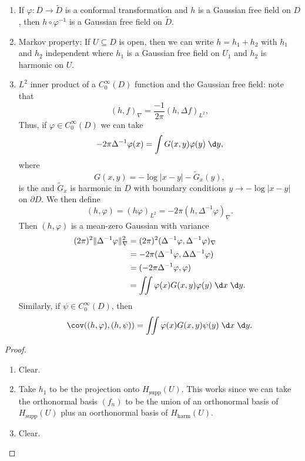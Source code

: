 \documentclass[a4paper]{article}
\begin{document}
\begin{prop}\leavevmode
  \begin{enumerate}
    \item If $\varphi: D \to \tilde{D}$ is a conformal transformation and $h$ is a Gaussian free field on $D$, then $h \circ \varphi^{-1}$ is a Gaussian free field on $\tilde{D}$.
    \item Markov property: If $U \subseteq D$ is open, then we can write $h = h_1 + h_2$ with $h_1$ and $h_2$ independent where $h_1$ is a Gaussian free field on $U_1$ and $h_2$ is harmonic on $U$.
    \item $L^2$ inner product of a $C_0^\infty(D)$ function and the Gaussian free field: note that
      \[
        (h, f)_\nabla = \frac{-1}{2\pi} (h, \Delta f)_{L^2},
      \]
      Thus, if $\varphi \in C_0^\infty(D)$ we can take
      \[
        -2\pi \Delta^{-1}\varphi(x) = \int G(x, y) \varphi(y) \;\d y,
      \]
      where
      \[
        G(x, y) = - \log |x - y| - \tilde{G}_x(y),
      \]
      is the  and $\tilde{G}_x$ is harmonic in $D$ with boundary conditions $y \to - \log |x - y|$ on $\partial D$. We then define
      \[
        (h, \varphi) = (h \varphi)_{L^2} = - 2\pi (h, \Delta^{-1}\varphi)_\nabla.
      \]
      Then $(h, \varphi)$ is a mean-zero Gaussian with variance
      \begin{align*}
        (2\pi)^2 \|\Delta^{-1} \varphi\|_{\nabla}^2 &= (2\pi)^2 (\Delta^{-1}\varphi, \Delta^{-1}\varphi)_{\nabla} \\
        &= - 2\pi (\Delta^{-1} \varphi, \Delta \Delta^{-1}\varphi)\\
        &= (-2\pi \Delta^{-1} \varphi, \varphi)\\
        &= \iint \varphi(x) G(x, y) \varphi(y)\;\d x\;\d y.
      \end{align*}
      Similarly, if $\psi \in C_0^\infty(D)$, then
      \[
        \cov( (h, \varphi), (h, \psi)) = \iint \varphi(x) G(x, y) \psi(y)\;\d x\;\d y.
      \]
  \end{enumerate}
\end{prop}

\begin{proof}\leavevmode
  \begin{enumerate}
    \item Clear.
    \item Take $h_1$ to be the projection onto $H_{\mathrm{supp}}(U)$. This works since we can take the orthonormal basis $(f_n)$ to be the union of an orthonormal basis of $H_{\mathrm{supp}}(U)$ plus an oorthonormal basis of $H_{\mathrm{harm}}(U)$.
    \item Clear.\qedhere
  \end{enumerate}
\end{proof}

\printindex
\end{document}
